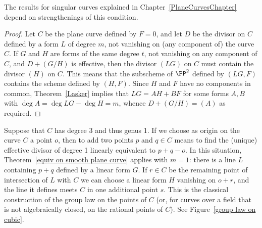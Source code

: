  The results for singular curves explained in Chapter~\ref{PlaneCurvesChapter}
 depend on strengthenings  of this condition.

\begin{proof}
Let $C$ be the plane curve defined by $F=0$, and let $D$ be the divisor on $C$ defined by a form $L$
of degree $m$, not vanishing on (any component of) the curve $C$. If $G$ and $H$ are forms of the same degree $t$,
not vanishing on any component of $C$,
and $D+(G/H)$ is effective, then the divisor $(LG)$  on $C$ must contain the divisor $(H)$ on $C$.
This means that the subscheme of $\PP^{2}$ defined by $(LG,F)$ contains the scheme defined
by $(H,F)$. Since $H$ and $F$ have no components in common, Theorem~\ref{Lasker} implies
that $LG = AH+BF$  for some forms $A,B$ with $\deg A = \deg LG -\deg H = m$,
 whence $D+(G/H) = (A)$
as required.
\end{proof}

\begin{example}
Suppose that $C$ has degree 3 and thus genus 1. If we choose as origin on the curve $C$ a point $o$, then to add two points $p$ and $q \in C$ means to find the (unique) effective divisor of degree 1 linearly equivalent to $p + q - o$. In this situation, Theorem~\ref{equiv on smooth plane curve} applies with $m=1$: there is a line $L$
containing $p+q$ defined by a linear form $G$. If $r \in C$ be the remaining point of intersection of $L$ with $C$ we can choose a linear form $H$ vanishing on $o+r$, and the line it defines meets $C$
in one additional point $s$. This is the classical construction of the
%
group law
on the points of $C$ (or,
for curves over a field that is not algebraically closed, on the rational points of $C$).
See Figure~\ref{group law on cubic}.
\end{example}

